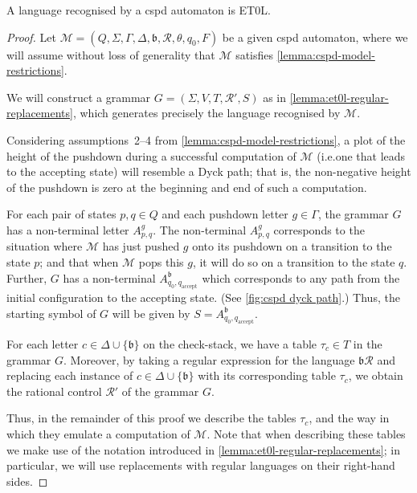 \begin{lemma}\label{prop:cspd-to-et0l}
	A language recognised by a cspd automaton is ET0L.
\end{lemma}

\begin{proof}
	Let $\mathcal{M} = (Q, \Sigma, \Gamma, \Delta, \mathfrak{b}, \mathcal{R}, \theta, q_0, F)$ be a given cspd automaton, where we will assume without loss of generality that $\mathcal{M}$ satisfies \cref{lemma:cspd-model-restrictions}.
	
	We will construct a grammar $G = (\Sigma,V,T,\mathcal{R}',S)$ as in \cref{lemma:et0l-regular-replacements}, which generates precisely the language recognised by $\mathcal{M}$.
	
	Considering assumptions~2--4 from \cref{lemma:cspd-model-restrictions}, a plot of the height of the pushdown during a successful computation of $\mathcal{M}$ (i.e.\@ one that leads to the accepting state) will resemble a Dyck path; that is, the non-negative height of the pushdown is zero at the beginning and end of such a computation.
	
	For each pair of states $p,q \in Q$ and each pushdown letter $g \in \Gamma$, the grammar $G$ has a non-terminal letter $A^g_{p,q}$.
	The non-terminal $A^g_{p,q}$ corresponds to the situation where $\mathcal{M}$ has just pushed $g$ onto its pushdown on a transition to the state $p$; and that when $\mathcal{M}$ pops this $g$, it will do so on a transition to the state $q$.
	Further, $G$ has a non-terminal $A^\mathfrak{b}_{q_0,q_\mathrm{accept}}$ which corresponds to any path from the initial configuration to the accepting state.
	(See \cref{fig:cspd dyck path}.)
	Thus, the starting symbol of $G$ will be given by $S = A^\mathfrak{b}_{q_0,q_\mathrm{accept}}$.
	
	For each letter $c \in \Delta \cup \{\mathfrak{b}\}$ on the check-stack, we have a table $\tau_c \in T$ in the grammar $G$.
	Moreover, by taking a regular expression for the language $\mathfrak{b}\mathcal{R}$ and replacing each instance of $c \in \Delta \cup \{\mathfrak{b}\}$ with its corresponding table $\tau_c$, we obtain the rational control $\mathcal{R}'$ of the grammar $G$.
	
	Thus, in the remainder of this proof we describe the tables $\tau_c$, and the way in which they emulate a computation of $\mathcal{M}$.
	Note that when describing these tables we make use of the notation introduced in \cref{lemma:et0l-regular-replacements};
	in particular, we will use replacements with regular languages on their right-hand sides.
	

\end{proof}
